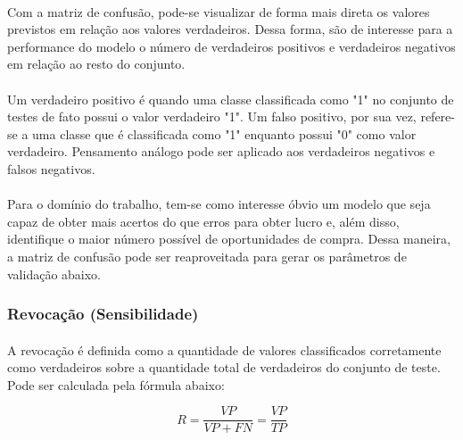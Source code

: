 \documentclass[grad,numbers]{coppe}
\begin{document}
                \paragraph{}Com a matriz de confusão, pode-se visualizar de forma mais direta os valores previstos em relação aos valores verdadeiros. Dessa forma, são de interesse para a performance do modelo o número de verdadeiros positivos e verdadeiros negativos em relação ao resto do conjunto.
                
                \paragraph{}Um verdadeiro positivo é quando uma classe classificada como "1" no conjunto de testes de fato possui o valor verdadeiro "1". Um falso positivo, por sua vez, refere-se a uma classe que é classificada como "1" enquanto possui "0" como valor verdadeiro. Pensamento análogo pode ser aplicado aos verdadeiros negativos e falsos negativos.
                
                \paragraph{}Para o domínio do trabalho, tem-se como interesse óbvio um modelo que seja capaz de obter mais acertos do que erros para obter lucro e, além disso, identifique o maior número possível de oportunidades de compra. Dessa maneira, a matriz de confusão pode ser reaproveitada para gerar os parâmetros de validação abaixo.
                
                \subsubsection{Revocação (Sensibilidade)}
                    \paragraph{}A revocação é definida como a quantidade de valores classificados corretamente como verdadeiros sobre a quantidade total de verdadeiros do conjunto de teste. Pode ser calculada pela fórmula abaixo:
                    
                    \begin{equation}
                        R = \frac{VP}{VP + FN} = \frac{VP}{TP}
                    \end{equation}
                    
\end{document}
